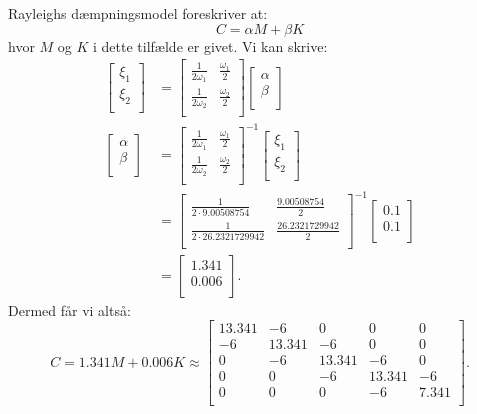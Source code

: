 \begin{derivation}
  Rayleighs dæmpningsmodel foreskriver at:
  \[ 
  C = \alpha M + \beta K
  \]
  hvor $M$ og $K$ i dette tilfælde er givet.
  Vi kan skrive:
  \begin{align*}
    \begin{bmatrix}
    \xi_1\\
    \xi_2\\
    \end{bmatrix} &= \begin{bmatrix}
    \frac{1}{2\omega_1} & \frac{\omega_1}{2}\\
    \frac{1}{2\omega_2} & \frac{\omega_2}{2}\\
    \end{bmatrix} \begin{bmatrix}
    \alpha\\
    \beta\\
    \end{bmatrix} \\
    \begin{bmatrix}
    \alpha\\
    \beta\\
    \end{bmatrix} &= \begin{bmatrix}
    \frac{1}{2\omega_1} & \frac{\omega_1}{2}\\
    \frac{1}{2\omega_2} & \frac{\omega_2}{2}\\
    \end{bmatrix}^{-1} \begin{bmatrix}
    \xi_1\\
    \xi_2\\
    \end{bmatrix} \\
    &= \begin{bmatrix}
    \frac{1}{2 \cdot \num{9,00508754}} & \frac{\num{9,00508754}}{2}\\
    \frac{1}{2 \cdot \num{26,2321729942}} & \frac{\num{26,2321729942}}{2}\\
    \end{bmatrix}^{-1} \begin{bmatrix}
    \num{0,1} \\
    \num{0,1} \\
    \end{bmatrix} \\
    &= \begin{bmatrix}
    \num{1,341} \\
    \num{0,006} \\
    \end{bmatrix}
  .\end{align*}
  Dermed får vi altså:
  \[ 
  C = \num{1,341} M + \num{0,006} K \approx \begin{bmatrix}
  \num{13,341}  & -6 & 0 & 0 & 0\\
  -6 & \num{13,341}  & -6 & 0 & 0\\
  0 & -6 & \num{13,341}  & -6 & 0\\
  0 & 0 & -6 & \num{13,341}  & -6\\
  0 & 0 & 0 & -6 & \num{7,341} \\
  \end{bmatrix}
  .\]  
\end{derivation}

\newpage
